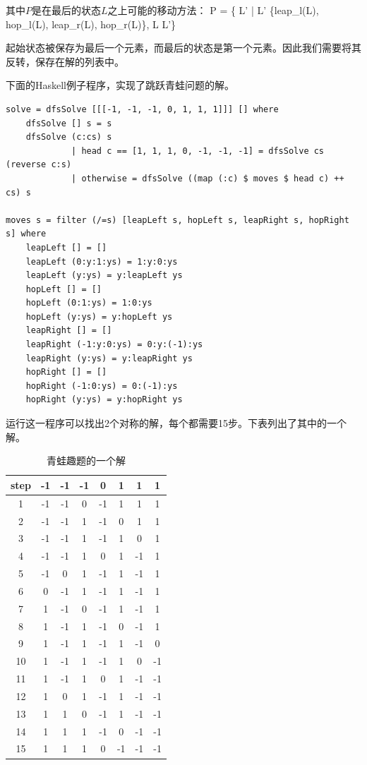 \documentclass[b5paper]{ctexart}
\begin{document}
其中$P$是在最后的状态$L$之上可能的移动方法：
\be
P = \{ L'  | L' \in \{leap_l(L), hop_l(L), leap_r(L), hop_r(L)\}, L \neq L'\}
\ee

起始状态被保存为最后一个元素，而最后的状态是第一个元素。因此我们需要将其反转，保存在解的列表中。

下面的Haskell例子程序，实现了跳跃青蛙问题的解。

\lstset{language=Haskell}
\begin{lstlisting}[style=Haskell]
solve = dfsSolve [[[-1, -1, -1, 0, 1, 1, 1]]] [] where
    dfsSolve [] s = s
    dfsSolve (c:cs) s
             | head c == [1, 1, 1, 0, -1, -1, -1] = dfsSolve cs (reverse c:s)
             | otherwise = dfsSolve ((map (:c) $ moves $ head c) ++ cs) s

moves s = filter (/=s) [leapLeft s, hopLeft s, leapRight s, hopRight s] where
    leapLeft [] = []
    leapLeft (0:y:1:ys) = 1:y:0:ys
    leapLeft (y:ys) = y:leapLeft ys
    hopLeft [] = []
    hopLeft (0:1:ys) = 1:0:ys
    hopLeft (y:ys) = y:hopLeft ys
    leapRight [] = []
    leapRight (-1:y:0:ys) = 0:y:(-1):ys
    leapRight (y:ys) = y:leapRight ys
    hopRight [] = []
    hopRight (-1:0:ys) = 0:(-1):ys
    hopRight (y:ys) = y:hopRight ys
\end{lstlisting}

运行这一程序可以找出2个对称的解，每个都需要15步。下表列出了其中的一个解。

\begin{table}[htbp]
\centering
\begin{tabular}{|c||c|c|c|c|c|c|c|}
\hline
step & -1 & -1 & -1 & 0 & 1 & 1 & 1 \\
\hline
1 & -1 & -1 & 0 & -1 & 1 & 1 & 1 \\
2 & -1 & -1 & 1 & -1 & 0 & 1 & 1 \\
3 & -1 & -1 & 1 & -1 & 1 & 0 & 1 \\
4 & -1 & -1 & 1 & 0 & 1 & -1 & 1 \\
5 & -1 & 0 & 1 & -1 & 1 & -1 & 1 \\
6 & 0 & -1 & 1 & -1 & 1 & -1 & 1 \\
7 & 1 & -1 & 0 & -1 & 1 & -1 & 1 \\
8 & 1 & -1 & 1 & -1 & 0 & -1 & 1 \\
9 & 1 & -1 & 1 & -1 & 1 & -1 & 0 \\
10 & 1 & -1 & 1 & -1 & 1 & 0 & -1 \\
11 & 1 & -1 & 1 & 0 & 1 & -1 & -1 \\
12 & 1 & 0 & 1 & -1 & 1 & -1 & -1 \\
13 & 1 & 1 & 0 & -1 & 1 & -1 & -1 \\
14 & 1 & 1 & 1 & -1 & 0 & -1 & -1 \\
15 & 1 & 1 & 1 & 0 & -1 & -1 & -1 \\
\hline
\end{tabular}
\caption{青蛙趣题的一个解} \label{tab:leap-frog-solution}
\end{table}
\end{document}
